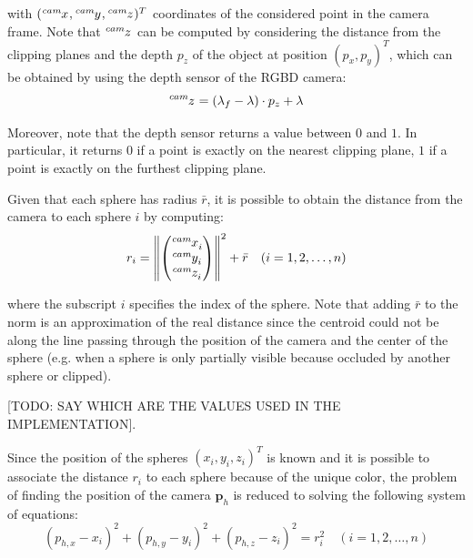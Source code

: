 \documentclass[a4paper]{article}
\newcommand\norm[1]{\left\lVert#1\right\rVert}
\begin{document}
\noindent with $(\tensor[^{cam}]{x}{}, \tensor[^{cam}]{y}{},
\tensor[^{cam}]{z}{})^T$ coordinates of the considered point
in the camera frame. Note that $\tensor[^{cam}]{z}{}$ can be
computed by
considering the distance from the clipping planes and the
depth $p_z$ of the object at position $(p_x, p_y)^T$, which can
be obtained by using the depth sensor of the RGBD camera:
\begin{equation}
    \tensor[^{cam}]{z}{} = (\lambda_f - \lambda) \cdot p_z + \lambda
\end{equation}

Moreover, note that the depth sensor returns a value between $0$ and $1$.
In particular, it returns $0$ if a point is exactly
on the nearest clipping plane, $1$ if a point is exactly on the
furthest clipping plane.

Given that each sphere has radius $\bar{r}$, it is possible to
obtain the distance from the camera to each sphere $i$ by computing:
\begin{equation}
    r_i =
    \norm{
        \begin{pmatrix}
            \tensor[^{cam}]{x}{_i} \\
            \tensor[^{cam}]{y}{_i} \\
            \tensor[^{cam}]{z}{_i}
        \end{pmatrix}
    }^2 + \bar{r} \quad (i = 1, 2, \dots, n)
\end{equation}

\noindent where the subscript $i$ specifies the index of the
sphere. Note that adding $\bar{r}$ to the norm is an
approximation of the real distance since the centroid could
not be along the line passing through the position of the
camera and the center of the sphere (e.g. when a sphere is
only partially visible because occluded by another sphere or
clipped).

[TODO: SAY WHICH ARE THE VALUES USED IN THE IMPLEMENTATION].

Since the position of the spheres $(x_i, y_i, z_i)^T$ is known
and it is possible
to associate the distance $r_i$ to each sphere because of the
unique color, the problem of finding the position of the 
camera $\bm{p}_h$ is reduced to solving the following system of equations:
\begin{equation}
    (p_{h,x} - x_i)^2 + (p_{h,y} - y_i)^2 + (p_{h,z} - z_i)^2 = r_i^2 \quad (i = 1, 2, \dots, n)
\end{equation}
\end{document}
